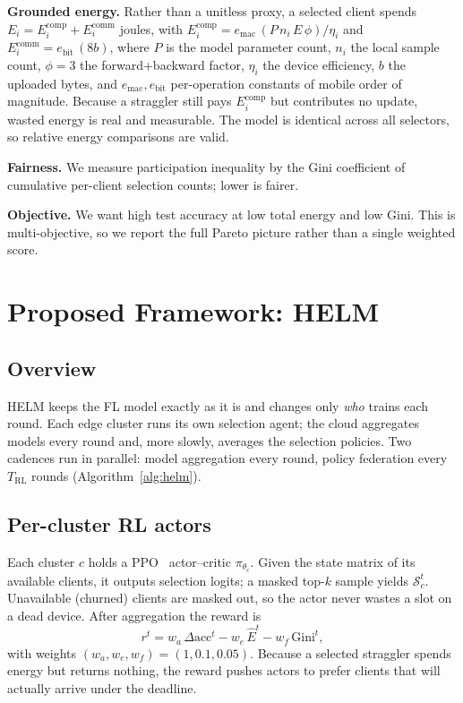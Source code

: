 \documentclass[conference]{IEEEtran}
\begin{document}
\textbf{Grounded energy.} Rather than a unitless proxy, a selected client spends
$E_i=E_i^{\text{comp}}+E_i^{\text{comm}}$ joules, with
$E_i^{\text{comp}}=e_{\text{mac}}\,(P\,n_i\,E\,\phi)/\eta_i$ and
$E_i^{\text{comm}}=e_{\text{bit}}\,(8b)$, where $P$ is the model parameter count,
$n_i$ the local sample count, $\phi{=}3$ the forward+backward factor, $\eta_i$ the
device efficiency, $b$ the uploaded bytes, and $e_{\text{mac}},e_{\text{bit}}$
per-operation constants of mobile order of magnitude. Because a straggler still
pays $E_i^{\text{comp}}$ but contributes no update, wasted energy is real and
measurable. The model is identical across all selectors, so relative energy
comparisons are valid.

\textbf{Fairness.} We measure participation inequality by the Gini coefficient of
cumulative per-client selection counts; lower is fairer.

\textbf{Objective.} We want high test accuracy at low total energy and low Gini.
This is multi-objective, so we report the full Pareto picture rather than a single
weighted score.

\section{Proposed Framework: HELM}
\subsection{Overview}
HELM keeps the FL model exactly as it is and changes only \emph{who} trains each
round. Each edge cluster runs its own selection agent; the cloud aggregates
models every round and, more slowly, averages the selection policies. Two cadences
run in parallel: model aggregation every round, policy federation every
$T_{\text{RL}}$ rounds (Algorithm~\ref{alg:helm}).

\subsection{Per-cluster RL actors}
Each cluster $c$ holds a PPO~\cite{ppo} actor--critic $\pi_{\theta_c}$. Given the
state matrix of its available clients, it outputs selection logits; a masked
top-$k$ sample yields $\mathcal{S}_c^t$. Unavailable (churned) clients are masked
out, so the actor never wastes a slot on a dead device. After aggregation the
reward is
\begin{equation}
r^t = w_a\,\Delta\text{acc}^t - w_e\,\widehat{E}^t - w_f\,\text{Gini}^t,
\end{equation}
with weights $(w_a,w_e,w_f){=}(1,0.1,0.05)$. Because a selected straggler spends
energy but returns nothing, the reward pushes actors to prefer clients that will
actually arrive under the deadline.
\end{document}

